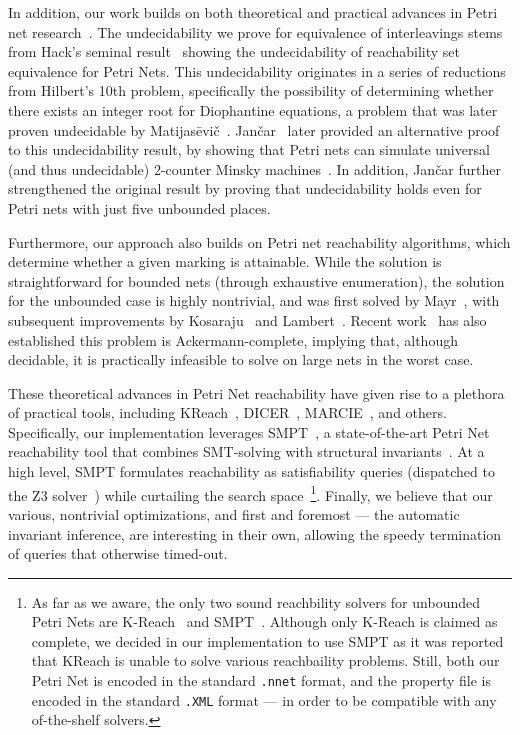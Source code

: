 In addition, our work builds on both theoretical and practical advances in Petri net research~\cite{Mu89, Es96, Re12, EsNi24}. The undecidability we prove for equivalence of interleavings stems from Hack’s seminal result~\cite{Ha76, HaThesis76} showing the undecidability of reachability set equivalence for Petri Nets. This undecidability originates in a series of reductions from Hilbert’s 10th problem, specifically the possibility of determining whether there exists an integer root for Diophantine equations, a problem that was later proven undecidable by Matijasēvič~\cite{Ma70}.
%
Jančar~\cite{Ja95} later provided an alternative proof to this undecidability result, by showing that Petri nets can simulate universal (and thus undecidable) 2-counter Minsky machines~\cite{Mi67}. In addition, Jančar further strengthened the original result by proving that undecidability holds even for Petri nets with just five unbounded places.

Furthermore, our approach also builds on Petri net reachability algorithms, which determine whether a given marking is attainable. While the solution is straightforward for bounded nets (through exhaustive enumeration), the solution for the unbounded case is highly nontrivial, and was first solved by Mayr~\cite{Ma81}, with subsequent improvements by Kosaraju~\cite{Ko82} and Lambert~\cite{La92}. Recent work~\cite{CzWo22} has also established this problem is Ackermann-complete, implying that, although decidable, it is practically infeasible to solve on large nets in the worst case.

These theoretical advances in Petri Net reachability have given rise to a 
plethora of practical tools, including KReach~\cite{DiLa20}, 
DICER~\cite{XiZhLi21}, MARCIE~\cite{HeRoSc13}, and others. 
%
Specifically, our implementation leverages SMPT~\cite{AmDa23}, a 
state-of-the-art Petri Net reachability tool that combines SMT-solving with 
structural invariants~\cite{AmBeDa21, AmDaHu22}. At a high level, SMPT 
formulates reachability as satisfiability queries (dispatched to the Z3 
solver~\cite{DeBj08}) while curtailing the search space~\footnote{As far as we 
aware, the only two sound reachbility solvers for unbounded Petri Nets are 
K-Reach~\cite{DiLa20} and SMPT~\cite{AmDa23}. Although only K-Reach is claimed 
as complete, we decided in our implementation to use SMPT as it was 
reported~\cite{Am23} that KReach is unable to solve various reachbaility 
problems. 
Still, both our Petri Net is encoded in the standard \texttt{.nnet} format, and 
the property file is encoded in the standard \texttt{.XML} format --- in order 
to be compatible with any of-the-shelf solvers.
}.
%
%
Finally, we believe that our various, nontrivial optimizations, and first and 
foremost --- the automatic invariant inference, are interesting in their own, 
allowing the speedy termination of queries that otherwise timed-out. 

